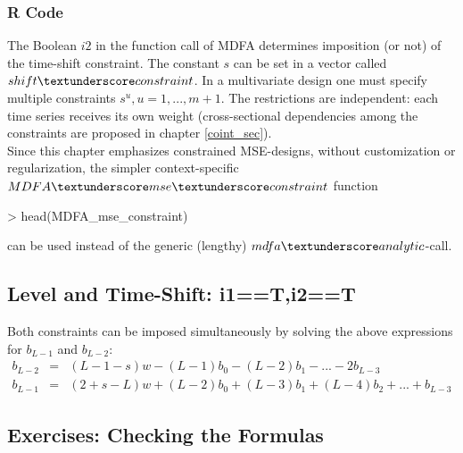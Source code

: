 \documentclass[a4paper]{book}
\begin{document}
\subsubsection{R Code}

The Boolean $i2$ in the function call of MDFA determines imposition (or not) of the time-shift constraint. The constant $s$ can be set in a vector called $shift\textunderscore constraint$. In a multivariate design one must specify multiple constraints $s^u, u=1,...,m+1$. The restrictions are independent: each time series receives its own weight (cross-sectional dependencies among the constraints are proposed in chapter \ref{coint_sec}).\\

Since this chapter emphasizes constrained MSE-designs, without customization or regularization, the simpler context-specific $MDFA\textunderscore mse\textunderscore constraint$ function
\begin{Schunk}
\begin{Sinput}
> head(MDFA_mse_constraint)
\end{Sinput}
\begin{Soutput}
1 function (L, weight_func, Lag, Gamma, i1, i2, weight_constraint, 
2     shift_constraint)                                            
3 {                                                                
4     cutoff <- pi                                                 
5     lin_eta <- F                                                 
6     lambda <- 0                                                  
\end{Soutput}
\end{Schunk}
can be used instead of the generic (lengthy) $mdfa\textunderscore analytic$-call.



\subsection{Level and Time-Shift: i1==T,i2==T}

Both constraints can be imposed simultaneously by solving the above expressions for $b_{L-1}$ and $b_{L-2}$:
\begin{eqnarray}\label{cons2}
b_{L-2}&=&(L-1-s)w-(L-1)b_0-(L-2)b_1-...-2b_{L-3}\label{cons2}\\
b_{L-1}&=&(2+s-L)w+(L-2)b_0+(L-3)b_1+(L-4)b_2+...+b_{L-3}\label{cons3}
\end{eqnarray}

\subsection{Exercises: Checking the Formulas}
\end{document}
